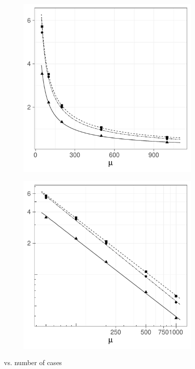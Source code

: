 \begin{figure}[htbp]
    \begin{subfigure}[b]{0.49\textwidth}
        \includegraphics[width=\textwidth]{results/by_num_cases/NMISE-vs-cases}
        \label{fig:ise:unif_NCases_1h:nmise}
    \end{subfigure}
    \begin{subfigure}[b]{0.49\textwidth}
        \includegraphics[width=\textwidth]{results/by_num_cases/NMISE-vs-cases-log-log}
        \label{fig:ise:unif_NCases_1h:nmise_log_log}
    \end{subfigure}
    \caption[: by number of cases]{ vs. number of cases}
    \label{fig:ise:unif_NCases_1h}
\end{figure}

